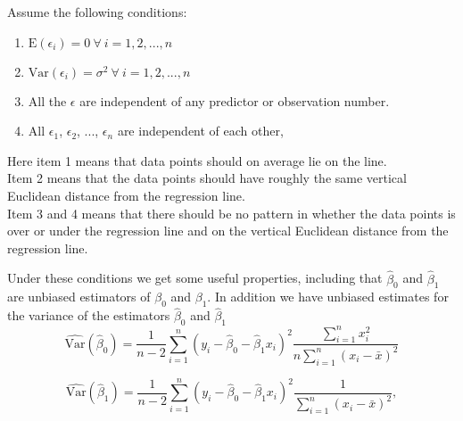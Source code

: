 \documentclass{article}
\begin{document}
Assume the following conditions:

\begin{enumerate}
\item \(\mathrm{E} \left( \epsilon_i \right) = 0\ \forall \ i = 1, 2, ..., n\)
\item \(\mathrm{Var} \left( \epsilon_i \right) = \sigma^2\ \forall \ i = 1, 2, ..., n\)
\item All the \(\epsilon\) are independent of any predictor or observation number.
\item All \(\epsilon_1\), \(\epsilon_2\), ..., \(\epsilon_n\) are independent of each other,
\end{enumerate}



Here item 1 means that data points should on average lie on the line. \\
Item 2 means that the data points should have roughly the same vertical
Euclidean distance from the regression line. \\
Item 3 and 4 means that there should be no pattern in whether the data points is over
or under the regression line and on the vertical Euclidean distance from the
regression line.

Under these conditions we get some useful properties, including that \(\hat{\beta}_0\) and \(\hat{\beta}_1\) are unbiased estimators of
\(\beta_0\) and \(\beta_1\). In addition we have
unbiased estimates for the
variance of the estimators \(\hat{\beta}_0\) and \(\hat{\beta}_1\)
\begin{equation*}
 \widehat{\mathrm{Var}} \left( \hat{\beta}_0 \right) = \frac{1}{n - 2} \sum_{i = 1}^n\left( y_i - \hat{\beta}_0 -
 \hat{\beta}_1 x_i \right)^2 \frac{\sum_{i = 1}^n x_i^2}{n
   \sum_{i = 1}^n \left( x_i - \bar{x} \right)^2}
\end{equation*}
 

\begin{equation*}
 \widehat{\mathrm{Var}} \left( \hat{\beta}_1 \right) = \frac{1}{n - 2} \sum_{i = 1}^n\left( y_i - \hat{\beta}_0 -
 \hat{\beta}_1 x_i \right)^2\frac{1}{
   \sum_{i = 1}^n \left( x_i - \bar{x} \right)^2},
\end{equation*}
\end{document}
